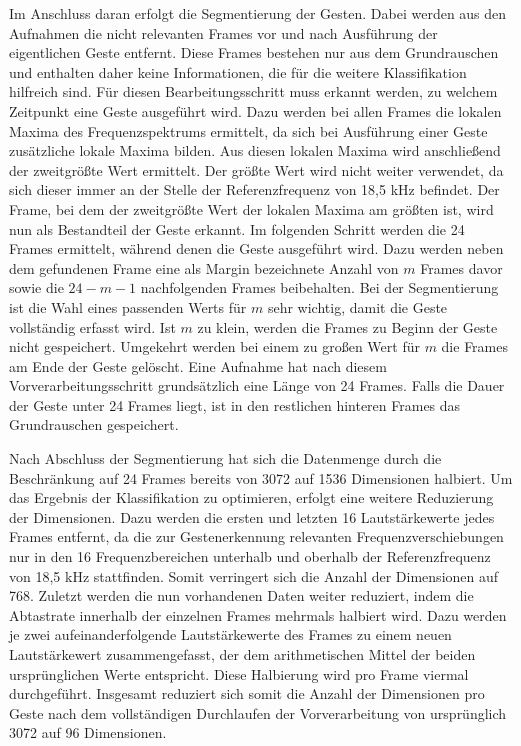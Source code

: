 Im Anschluss daran erfolgt die Segmentierung der Gesten. Dabei werden aus den Aufnahmen die nicht relevanten Frames vor und nach Ausführung der eigentlichen Geste entfernt. Diese Frames bestehen nur aus dem Grundrauschen und enthalten daher keine Informationen, die für die weitere Klassifikation hilfreich sind.
Für diesen Bearbeitungsschritt muss erkannt werden, zu welchem Zeitpunkt eine Geste ausgeführt wird. Dazu werden bei allen Frames die lokalen Maxima des Frequenzspektrums ermittelt, da sich bei Ausführung einer Geste zusätzliche lokale Maxima bilden.
Aus diesen lokalen Maxima wird anschließend der zweitgrößte Wert ermittelt. Der größte Wert wird nicht weiter verwendet, da sich dieser immer an der Stelle der Referenzfrequenz von 18,5 kHz befindet. 
Der Frame, bei dem der zweitgrößte Wert der lokalen Maxima am größten ist, wird nun als Bestandteil der Geste erkannt. 
Im folgenden Schritt werden die 24 Frames ermittelt, während denen die Geste ausgeführt wird. 
Dazu werden neben dem gefundenen Frame eine als Margin bezeichnete Anzahl von $m$ Frames davor sowie die $24-m-1$ nachfolgenden Frames beibehalten. Bei der Segmentierung ist die Wahl eines passenden Werts für $m$ sehr wichtig, damit die Geste vollständig erfasst wird. Ist $m$ zu klein, werden die Frames zu Beginn der Geste nicht gespeichert. Umgekehrt werden bei einem zu großen Wert für $m$ die Frames am Ende der Geste gelöscht. Eine Aufnahme hat nach diesem Vorverarbeitungsschritt grundsätzlich eine Länge von 24 Frames. Falls die Dauer der Geste unter 24 Frames liegt, ist in den restlichen hinteren Frames das Grundrauschen gespeichert.

Nach Abschluss der Segmentierung hat sich die Datenmenge durch die Beschränkung auf 24 Frames bereits von 3072 auf 1536 Dimensionen halbiert. Um das Ergebnis der Klassifikation zu optimieren, erfolgt eine weitere Reduzierung der Dimensionen. Dazu werden die ersten und letzten 16 Lautstärkewerte jedes Frames entfernt, da die zur Gestenerkennung relevanten Frequenzverschiebungen nur in den 16 Frequenzbereichen unterhalb und oberhalb der Referenzfrequenz von 18,5 kHz stattfinden. Somit verringert sich die Anzahl der Dimensionen auf 768. Zuletzt werden die nun vorhandenen Daten weiter reduziert, indem die Abtastrate innerhalb der einzelnen Frames mehrmals halbiert wird. Dazu werden je zwei aufeinanderfolgende Lautstärkewerte des Frames zu einem neuen Lautstärkewert zusammengefasst, der dem arithmetischen Mittel der beiden ursprünglichen Werte entspricht. Diese Halbierung wird pro Frame viermal durchgeführt.
Insgesamt reduziert sich somit die Anzahl der Dimensionen pro Geste nach dem vollständigen Durchlaufen der Vorverarbeitung von ursprünglich 3072 auf 96 Dimensionen. 

